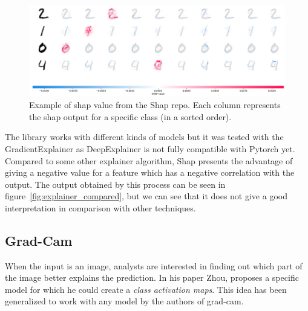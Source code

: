 \begin{figure}
 \centering
 \includegraphics[width=.9\linewidth]{figures/shap_mnist_image_plot.png}
 \captionsetup{width=.9\linewidth}
 \caption[ShapExample]{Example of shap value from the Shap repo\footnotemark{}. Each column represents the shap output for a specific class (in a sorted order).}
 \label{fig:shap_example}
\end{figure}

The library\cite{shap_lundberg2017unified} works with different kinds of models but it was tested with the GradientExplainer as DeepExplainer is not fully compatible with Pytorch yet. Compared to some other explainer algorithm, Shap presents the advantage of giving a negative value for a feature which has a negative correlation with the output. The output obtained by this process can be seen in figure~\ref{fig:explainer_compared}, but we can see that it does not give a good interpretation in comparison with other techniques.



\subsection{Grad-Cam}
When the input is an image, analysts are interested in finding out which part of the image better explains the prediction. In his paper\cite{zhou2015cnnlocalization} Zhou, proposes a specific model for which he could create a \textit{class activation maps}. This idea has been generalized to work with any model by the authors of grad-cam. 

